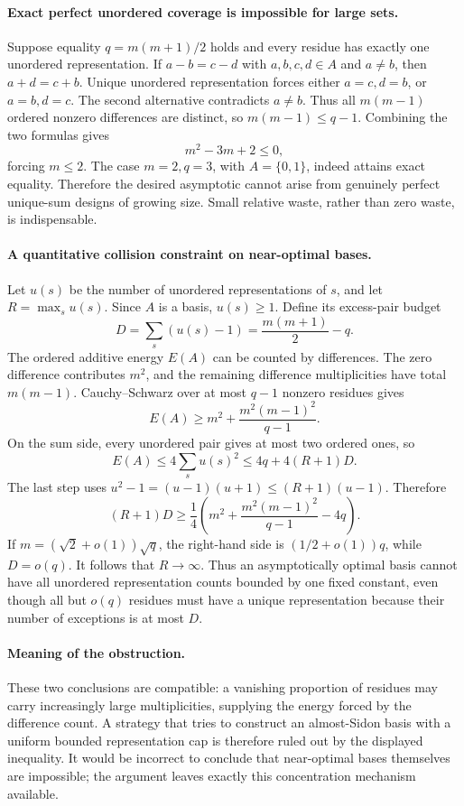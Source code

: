 \documentclass[11pt,a4paper]{article}
\begin{document}
\paragraph{Exact perfect unordered coverage is impossible for large sets.}
Suppose equality $q=m(m+1)/2$ holds and every residue has exactly one unordered representation. If $a-b=c-d$ with $a,b,c,d\in A$ and $a\ne b$, then $a+d=c+b$. Unique unordered representation forces either $a=c,d=b$, or $a=b,d=c$. The second alternative contradicts $a\ne b$. Thus all $m(m-1)$ ordered nonzero differences are distinct, so $m(m-1)\leq q-1$. Combining the two formulas gives
\[
 m^2-3m+2\leq0,
\]
forcing $m\leq2$. The case $m=2,q=3$, with $A=\{0,1\}$, indeed attains exact equality. Therefore the desired asymptotic cannot arise from genuinely perfect unique-sum designs of growing size. Small relative waste, rather than zero waste, is indispensable.

\paragraph{A quantitative collision constraint on near-optimal bases.}
Let $u(s)$ be the number of unordered representations of $s$, and let $R=\max_su(s)$. Since $A$ is a basis, $u(s)\geq1$. Define its excess-pair budget
\[
 D=\sum_s(u(s)-1)=\frac{m(m+1)}2-q.
\]
The ordered additive energy $E(A)$ can be counted by differences. The zero difference contributes $m^2$, and the remaining difference multiplicities have total $m(m-1)$. Cauchy--Schwarz over at most $q-1$ nonzero residues gives
\[
 E(A)\geq m^2+\frac{m^2(m-1)^2}{q-1}.
\]
On the sum side, every unordered pair gives at most two ordered ones, so
\[
 E(A)\leq4\sum_su(s)^2
 \leq4q+4(R+1)D.
\]
The last step uses $u^2-1=(u-1)(u+1)\leq(R+1)(u-1)$. Therefore
\[
 (R+1)D\geq\frac14\left(m^2+
 \frac{m^2(m-1)^2}{q-1}-4q\right).
\]
If $m=(\sqrt2+o(1))\sqrt q$, the right-hand side is $(1/2+o(1))q$, while $D=o(q)$. It follows that $R\to\infty$. Thus an asymptotically optimal basis cannot have all unordered representation counts bounded by one fixed constant, even though all but $o(q)$ residues must have a unique representation because their number of exceptions is at most $D$.

\paragraph{Meaning of the obstruction.}
These two conclusions are compatible: a vanishing proportion of residues may carry increasingly large multiplicities, supplying the energy forced by the difference count. A strategy that tries to construct an almost-Sidon basis with a uniform bounded representation cap is therefore ruled out by the displayed inequality. It would be incorrect to conclude that near-optimal bases themselves are impossible; the argument leaves exactly this concentration mechanism available.
\end{document}
